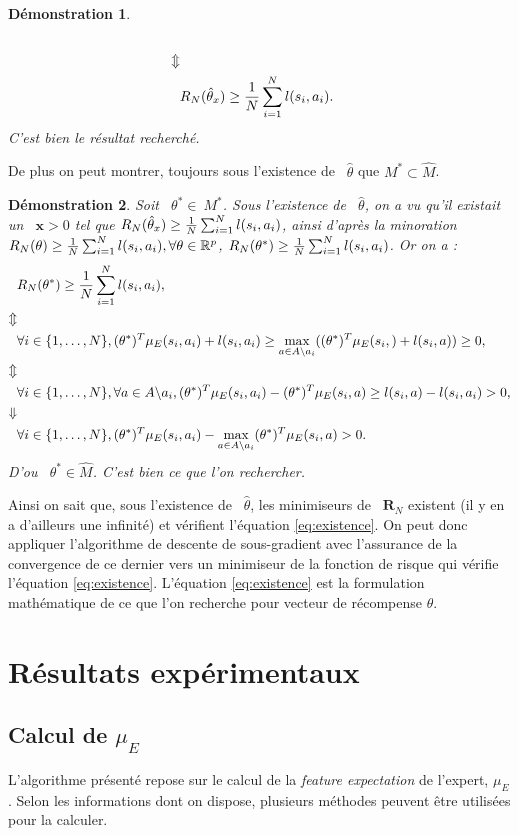\documentclass[publibook-draft]{CAp2012}
\newtheorem{preuve}{Démonstration}
\newcommand{\R}{\mathbf{R}}
\newcommand{\x}{\mathbf{x}}
\begin{document}
{\begin{preuve}
\begin{align}
\\
\Updownarrow
\\
&R_N(\hat{\theta}_x)\geq {1\over N} \sum_{i=1}^N l(s_i,a_i).
\end{align}
C'est bien le résultat recherché.
\end{preuve}
De plus on peut montrer, toujours sous l'existence de ~$\hat{\theta}$ que $M^*\subset\hat{M}$.
\begin{preuve}
Soit ~$\theta^*\in\ M^*$. Sous l'existence de ~$\hat{\theta}$, on a vu qu'il existait un ~$\x>0$ tel que $R_N(\hat{\theta}_x)\geq {1\over N} \sum_{i=1}^N l(s_i,a_i)$, ainsi d'après la minoration $R_N(\theta)\geq {1\over N} \sum_{i=1}^Nl(s_i,a_i), \forall \theta\in\mathbb{R}^p$, $R_N(\theta^*)\geq {1\over N} \sum_{i=1}^N l(s_i,a_i)$.
Or on a :
\begin{align}
&R_N(\theta^*)\geq {1\over N} \sum_{i=1}^N l(s_i,a_i),
\\
\Updownarrow
\\
&\forall i\in\{1,\dots,N\}, (\theta^*)^T\mu_E(s_i,a_i) + l(s_i,a_i)\geq\max_{a \in A \backslash a_i}((\theta^*)^T\mu_E(s_i,)+l(s_i,a))\geq0,
\\
\Updownarrow
\\
&\forall i\in\{1,\dots,N\},\forall a \in A \backslash a_i,  (\theta^*)^T\mu_E(s_i,a_i)-(\theta^*)^T\mu_E(s_i,a)\geq l(s_i,a)- l(s_i,a_i)>0,
\\
\Downarrow
\\
&\forall i\in\{1,\dots,N\}, (\theta^*)^T\mu_E(s_i,a_i)-\max_{a \in A \backslash a_i}(\theta^*)^T\mu_E(s_i,a)>0.
\end{align}
D'ou ~$\theta^*\in \hat{M}$. C'est bien ce que l'on rechercher.
\end{preuve}
Ainsi on sait que, sous l'existence de ~$\hat{\theta}$, les minimiseurs de ~$\R_N$ existent (il y en a d'ailleurs une infinité) et vérifient l'équation \ref{eq:existence}.
On peut donc appliquer l'algorithme de descente de sous-gradient avec l'assurance de la convergence de ce dernier vers un minimiseur de la fonction de risque qui vérifie l'équation \ref{eq:existence}. L'équation \ref{eq:existence} est la formulation mathématique de ce que l'on recherche pour vecteur de récompense $\theta$.
\section{Résultats expérimentaux}
\label{exp.sec}
\subsection{Calcul de $\mu_E$}
\label{calculmu.sec}
L'algorithme présenté repose sur le calcul de la {\it feature expectation} de l'expert, $\mu_E$. Selon les informations dont on dispose, plusieurs méthodes peuvent être utilisées pour la calculer.

}
\end{document}
